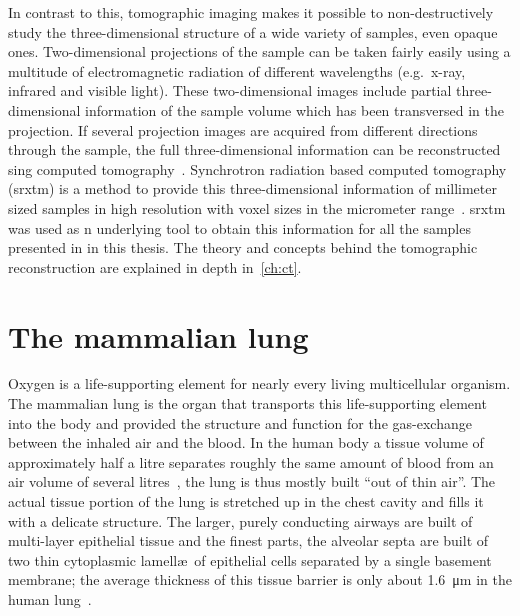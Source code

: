 In contrast to this, tomographic imaging makes it possible to non-destructively study the three-dimensional structure of a wide variety of samples, even opaque ones. Two-dimensional projections of the sample can be taken fairly easily using a multitude of electromagnetic radiation of different wavelengths (e.g.\ x-ray, infrared and visible light). These two-dimensional images include partial three-dimensional information of the sample volume which has been transversed in the projection. If several projection images are acquired from different directions through the sample, the full three-dimensional information can be reconstructed sing computed tomography~\cite{Hounsfield1976a}. Synchrotron radiation based computed tomography (\acs{srxtm}) is a method to provide this three-dimensional information of millimeter sized samples in high resolution with voxel sizes in the micrometer range~\cite{Bonse2008}. \ac{srxtm} was used as n underlying tool to obtain this information for all the samples presented in in this thesis. The theory and concepts behind the tomographic reconstruction are explained in depth in~\autoref{ch:ct}.

\section{The mammalian lung}
Oxygen is a life-supporting element for nearly every living multicellular organism. The mammalian lung is the organ that transports this life-supporting element into the body and provided the structure and function for the gas-exchange between the inhaled air and the blood. In the human body a tissue volume of approximately half a litre separates roughly the same amount of blood from an air volume of several litres~\cite{Weibel2009}, the lung is thus mostly built ``out of thin air''. The actual tissue portion of the lung is stretched up in the chest cavity and fills it with a delicate structure. The larger, purely conducting airways are built of multi-layer epithelial tissue and the finest parts, the alveolar septa are built of two thin cytoplasmic lamell\ae\ of epithelial cells separated by a single basement membrane; the average thickness of this tissue barrier is only about \SI{1.6}{\micro\meter} in the human lung~\cite{Weibel2009}.

